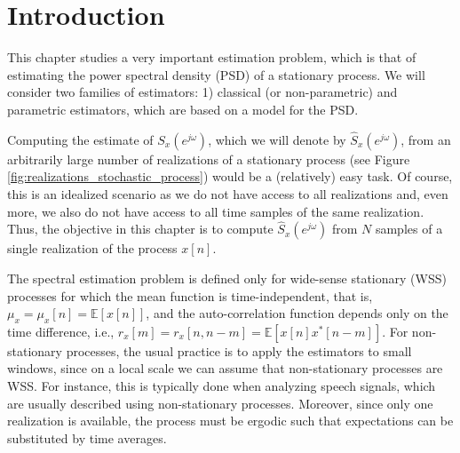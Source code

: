 \section{Introduction}

This chapter studies a very important estimation problem, which is that of estimating the power spectral density (PSD) of a stationary process. We will consider two families of estimators: 1) classical (or non-parametric) and parametric estimators, which are based on a model for the PSD.

Computing the estimate of $S_x(e^{j \omega})$, which we will denote by $\hat{S}_x(e^{j \omega})$, from an arbitrarily large number of realizations of a stationary process (see Figure \ref{fig:realizations_stochastic_process}) would be a (relatively) easy task. Of course, this is an idealized scenario as we do not have access to all realizations and, even more, we also do not have access to all time samples of the same realization. Thus, the objective in this chapter is to compute $\hat{S}_x(e^{j \omega})$ from $N$ samples of a single realization of the process $x[n]$.

The spectral estimation problem is defined only for wide-sense stationary (WSS) processes for which the mean function is time-independent, that is, $\mu_x = \mu_x[n] = \mathbb{E}[x[n]]$, and the auto-correlation function depends only on the time difference, i.e., $r_{x}[m] = r_{x}[n,n-m] = \mathbb{E}[x[n] x^{\ast}[n-m]]$. For non-stationary processes, the usual practice is to apply the estimators to small windows, since on a local scale we can assume that non-stationary processes are WSS. For instance, this is typically done when analyzing speech signals, which are usually described using non-stationary processes. Moreover, since only one realization is available, the process must be ergodic such that expectations can be substituted by time averages.

